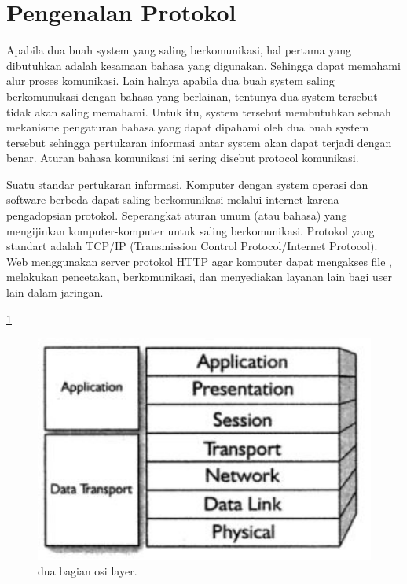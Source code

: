 

\section{Pengenalan Protokol} 
Apabila dua buah system yang saling berkomunikasi, hal pertama yang dibutuhkan adalah kesamaan bahasa yang digunakan. Sehingga dapat 
memahami alur proses komunikasi. Lain halnya apabila dua buah system saling berkomunukasi dengan bahasa yang berlainan, tentunya dua 
system tersebut tidak akan saling memahami. Untuk itu, system tersebut membutuhkan sebuah mekanisme pengaturan bahasa yang dapat 
dipahami oleh dua buah system tersebut sehingga pertukaran informasi antar system akan dapat terjadi dengan benar. Aturan bahasa 
komunikasi ini sering disebut protocol komunikasi. 
 
Suatu standar pertukaran informasi. Komputer dengan system operasi dan software berbeda dapat saling berkomunikasi melalui internet 
karena pengadopsian protokol. Seperangkat aturan umum (atau bahasa) yang mengijinkan komputer-komputer untuk saling berkomunikasi. 
Protokol yang standart adalah TCP/IP (Transmission Control Protocol/Internet Protocol). Web menggunakan server protokol HTTP agar 
komputer dapat mengakses file , melakukan pencetakan, berkomunikasi, dan menyediakan layanan lain bagi user lain dalam jaringan.
 
 \ref{osilayer} 
    \begin{figure}[ht] 
    \centerline{\includegraphics[width=1\textwidth]{figures/osilayer.JPG}} 
    \caption{dua bagian osi layer.} 
    \label{osilayer} 
    \end{figure}
    
